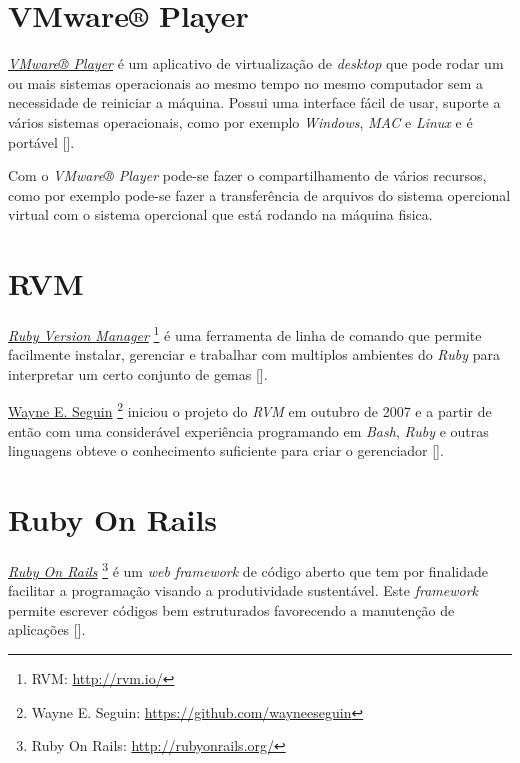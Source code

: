 \section{VMware® Player}
\label{section:vmware_player}

\emph{\href{http://www.vmware.com/products/player}{VMware® Player}} é um aplicativo de virtualização de 
\emph{desktop} que pode rodar um ou mais sistemas operacionais ao mesmo tempo no mesmo computador sem 
a necessidade de reiniciar a máquina. Possui uma interface fácil de usar, suporte a vários sistemas 
operacionais, como por exemplo \emph{Windows}, \emph{MAC} e \emph{Linux} e é portável 
[].

Com o \emph{VMware® Player} pode-se fazer o compartilhamento de vários recursos, como por exemplo pode-se 
fazer a transferência de arquivos do sistema opercional virtual com o sistema opercional que está rodando 
na máquina fisica. 

\section{RVM}
\label{section:rvm}

\emph{\href{http://rvm.io/}{Ruby Version Manager}} \footnote{RVM: \url{http://rvm.io/}} é uma 
ferramenta de linha de comando que permite facilmente instalar, gerenciar e trabalhar com multiplos ambientes 
do \emph{Ruby} para interpretar um certo conjunto de gemas [].

 \href{https://github.com/wayneeseguin}{Wayne E. Seguin} \footnote{Wayne E. Seguin: 
 \url{https://github.com/wayneeseguin}} iniciou o projeto do \emph{RVM} em outubro de 2007
e a partir de então com uma considerável experiência programando em \emph{Bash}, \emph{Ruby} e outras 
linguagens obteve o conhecimento suficiente para criar o gerenciador [].

\section{Ruby On Rails}
\label{section:ruby_on_rails}

\emph{\href{http://rubyonrails.org/}{Ruby On Rails}} \footnote{Ruby On Rails: \url{http://rubyonrails.org/}} 
é um \emph{web framework} de código aberto que tem por finalidade facilitar a programação
visando a produtividade sustentável. Este \emph{framework} permite escrever códigos bem estruturados
favorecendo a manutenção de aplicações [].

